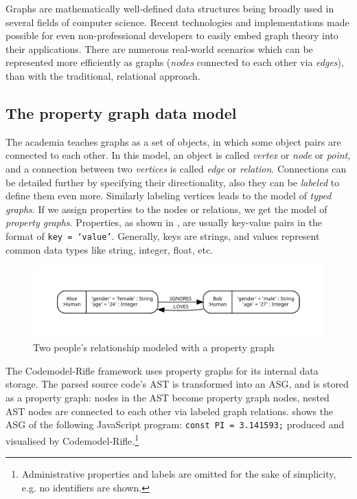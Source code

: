 Graphs are mathematically well-defined data structures being broadly used in several fields of computer science. Recent technologies and implementations made possible for even non-professional developers to easily embed graph theory into their applications. There are numerous real-world scenarios which can be represented more efficiently as graphs (\emph{nodes} connected to each other via \emph{edges}), than with the traditional, relational approach.

\subsection{The property graph data model}

The academia teaches graphs as a set of objects, in which some object pairs are connected to each other. In this model, an object is called \emph{vertex} or \emph{node} or \emph{point}, and a connection between two \emph{vertices} is called \emph{edge} or \emph{relation}. Connections can be detailed further by specifying their directionality, also they can be \emph{labeled} to define them even more. Similarly labeling vertices leads to the model of \emph{typed graphs}. If we assign properties to the nodes or relations, we get the model of \emph{property graphs}. Properties, as shown in , are usually key-value pairs in the format of \texttt{key = `value'}. Generally, keys are strings, and values represent common data types like string, integer, float, etc.

\begin{figure}[!htb]
	\centering
	\includegraphics[width=\textwidth, trim=1cm 1cm 1cm 1cm,clip]{figures/property-graph.pdf}
	\caption{Two people's relationship modeled with a property graph}
	\label{fig:property-graph}
\end{figure}

The Codemodel-Rifle framework uses property graphs for its internal data storage. The parsed source code's AST is transformed into an ASG, and is stored as a property graph: nodes in the AST become property graph nodes, nested AST nodes are connected to each other via labeled graph relations.  shows the ASG of the following JavaScript program: \texttt{const PI = 3.141593;} produced and visualised by Codemodel-Rifle.\footnote{Administrative properties and labels are omitted for the sake of simplicity, e.g. no identifiers are shown.}

